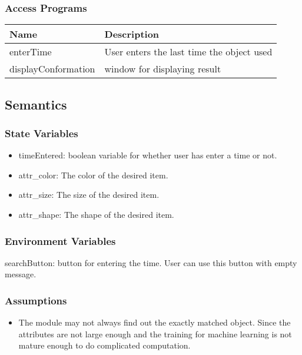 \documentclass[12pt, titlepage]{article}
\begin{document}
\subsubsection{Access Programs}


\begin{center}
\begin{tabular}{p{4cm} p{8cm} }
\hline
\textbf{Name} & \textbf{Description}  \\
\hline
enterTime & User enters the last time the object used \\
\hline
displayConformation & window for displaying result\\
\hline

\end{tabular}
\end{center}

\subsection{Semantics}

\subsubsection{State Variables}
\begin{itemize}
\item timeEntered: boolean variable for whether user has enter a time or not.
\item attr\_color: The color of the desired item.
\item attr\_size: The size of the desired item.
\item attr\_shape: The shape of the desired item.
\end{itemize}


\subsubsection{Environment Variables}

searchButton: button for entering the time. User can use this button with empty message.

\subsubsection{Assumptions}

\begin{itemize}
\item The module may not always find out the exactly matched object. Since the attributes are not large enough and the training for machine learning is not mature enough to do complicated computation.
\end{itemize}
\end{document}
